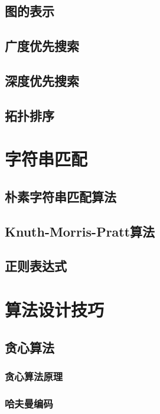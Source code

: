 \documentclass[oneside]{ctexbook}
\begin{document}
\section{图的表示}

\section{广度优先搜索}

\section{深度优先搜索}

\section{拓扑排序}

\chapter{字符串匹配}

\section{朴素字符串匹配算法}

\section{Knuth-Morris-Pratt算法}

\section{正则表达式}

\chapter{算法设计技巧}

\section{贪心算法}

\subsection{贪心算法原理}

\subsection{哈夫曼编码}
\end{document}
